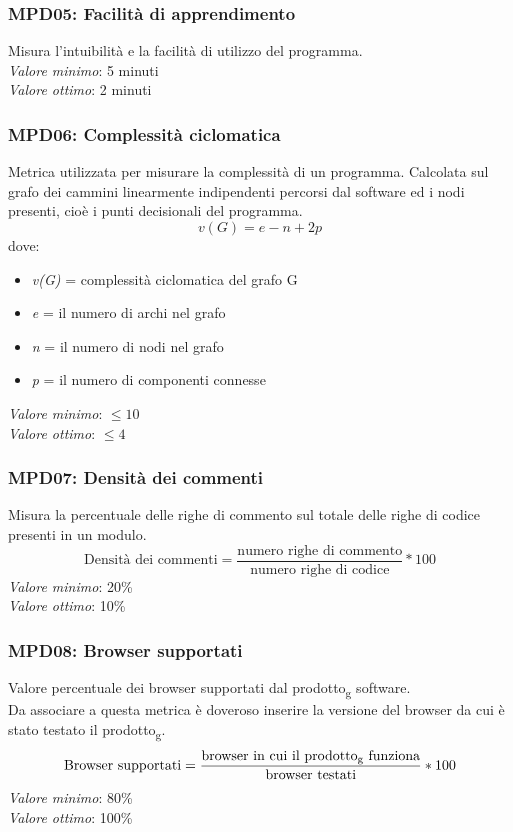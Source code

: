\subsubsection{MPD05: Facilità di apprendimento}
Misura l'intuibilità e la facilità di utilizzo del programma.\\
\textit{Valore minimo}: 5 minuti\\
\textit{Valore ottimo}: 2 minuti\\

\subsubsection{MPD06: Complessità ciclomatica}
Metrica utilizzata per misurare la complessità di un programma. Calcolata sul grafo dei cammini linearmente indipendenti percorsi dal software ed i nodi presenti, cioè i punti decisionali del programma.\\
\begin{equation*}
v(G) = e - n + 2p
\end{equation*}
dove:
\begin{itemize}
	\item \textit{v(G)} = complessità ciclomatica del grafo G
	\item \textit{e} = il numero di archi nel grafo
	\item \textit{n} = il numero di nodi nel grafo
	\item \textit{p} = il numero di componenti connesse
\end{itemize}
\textit{Valore minimo}: $ \le 10 $\\
\textit{Valore ottimo}: $ \le 4 $\\

\subsubsection{MPD07: Densità dei commenti}
Misura la percentuale delle righe di commento sul totale delle righe di codice presenti in un modulo.\\
\begin{equation*}
\text{Densità dei commenti}=\frac{\text{numero righe di commento}}{\text{numero righe di codice}}*100
\end{equation*}
\textit{Valore minimo}: 20\%\\
\textit{Valore ottimo}: 10\%\\

\subsubsection{MPD08: Browser supportati}
Valore percentuale dei browser supportati dal prodotto\textsubscript{g} software.\\
Da associare a questa metrica è doveroso inserire la versione del browser da cui è stato testato il prodotto\textsubscript{g}.
\begin{equation*}
\text{Browser supportati}=\frac{\text{browser in cui il prodotto\textsubscript{g} funziona}}{\text{browser testati}}*100
\end{equation*}	
\textit{Valore minimo}: 80\%\\
\textit{Valore ottimo}: 100\%\\